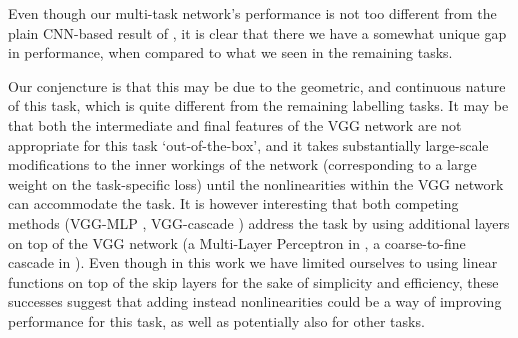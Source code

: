 \documentclass[10pt,twocolumn,letterpaper]{article}
\begin{document}
 
Even though our multi-task network's performance  is not too different from the plain CNN-based result of \cite{WangFG15}, it is clear that there we have a somewhat unique gap in performance, when compared to what we seen in the remaining tasks. 

 Our conjencture is that this may be due to the geometric, and continuous nature of this task, which is quite different from the remaining labelling tasks. It may be that both the intermediate and final features of the VGG network are not  appropriate for this task `out-of-the-box', and it takes substantially large-scale modifications to the inner workings of the network (corresponding to a large weight on the task-specific loss) until the nonlinearities within the VGG network can accommodate the task. It is however interesting that both competing methods (VGG-MLP \cite{BansalRG16}, VGG-cascade \cite{Eigen15}) address the task by using additional layers on top of the VGG network (a Multi-Layer Perceptron in \cite{BansalRG16}, a coarse-to-fine cascade in \cite{Eigen15}). Even though in this work we have limited ourselves to using linear functions on top of the skip layers for the sake of simplicity and efficiency, these successes suggest that adding instead nonlinearities could be a way of improving performance for this task, as well as potentially also for other tasks. 
  
 
 
 
 

 












\begin{table*}
	\caption{Impact of the weight used for the normal estimation loss, when training for 7-tasks: Improving normal estimation comes at the cost of  decreasing  performance in the remaining tasks  (higher is better for all tasks). \label{table:resultsnrm}}
\end{table*}
\end{document}
